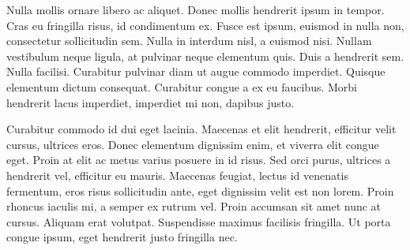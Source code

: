 Nulla mollis ornare libero ac aliquet. Donec mollis hendrerit ipsum in tempor. Cras eu fringilla risus, id condimentum ex. Fusce est ipsum, euismod in nulla non, consectetur sollicitudin sem. Nulla in interdum nisl, a euismod nisi. Nullam vestibulum neque ligula, at pulvinar neque elementum quis. Duis a hendrerit sem. Nulla facilisi. Curabitur pulvinar diam ut augue commodo imperdiet. Quisque elementum dictum consequat. Curabitur congue a ex eu faucibus. Morbi hendrerit lacus imperdiet, imperdiet mi non, dapibus justo.

Curabitur commodo id dui eget lacinia. Maecenas et elit hendrerit, efficitur velit cursus, ultrices eros. Donec elementum dignissim enim, et viverra elit congue eget. Proin at elit ac metus varius posuere in id risus. Sed orci purus, ultrices a hendrerit vel, efficitur eu mauris. Maecenas feugiat, lectus id venenatis fermentum, eros risus sollicitudin ante, eget dignissim velit est non lorem. Proin rhoncus iaculis mi, a semper ex rutrum vel. Proin accumsan sit amet nunc at cursus. Aliquam erat volutpat. Suspendisse maximus facilisis fringilla. Ut porta congue ipsum, eget hendrerit justo fringilla nec. 
